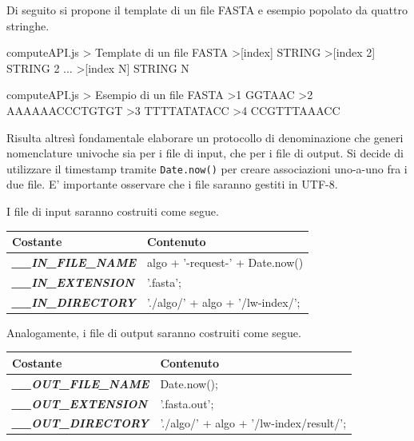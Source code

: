 Di seguito si propone il template di un file FASTA e esempio popolato da quattro stringhe.

\begin{sexylisting}{computeAPI.js > Template di un file FASTA}
>[index]
STRING
>[index 2]
STRING 2
...
>[index N]
STRING N
\end{sexylisting}

\begin{sexylisting}{computeAPI.js > Esempio di un file FASTA}
>1
GGTAAC
>2
AAAAAACCCTGTGT
>3
TTTTATATACC
>4
CCGTTTAAACC
\end{sexylisting}

Risulta altresì fondamentale elaborare un protocollo di denominazione che generi nomenclature univoche sia per i file di input, che per i file di output. Si decide di utilizzare il timestamp tramite \verb|Date.now()| per creare associazioni uno-a-uno fra i due file. E' importante osservare che i file saranno gestiti in UTF-8.

\vspace{5mm}

I file di input saranno costruiti come segue.

\begin{table}[H]
\begin{tabular}{@{}ll@{}}
\toprule
\textbf{Costante}                    & \textbf{Contenuto}               \\ \midrule
\textit{\textbf{\_\_IN\_FILE\_NAME}} & algo + '-request-' + Date.now()  \\
\textit{\textbf{\_\_IN\_EXTENSION}}  & '.fasta';                        \\
\textit{\textbf{\_\_IN\_DIRECTORY}}  & './algo/' + algo + '/lw-index/'; \\ \bottomrule
\end{tabular}
\end{table}

Analogamente, i file di output saranno costruiti come segue.

\begin{table}[H]
\begin{tabular}{ll}
\hline
\textbf{Costante}                     & \textbf{Contenuto}                      \\ \hline
\textit{\textbf{\_\_OUT\_FILE\_NAME}} & Date.now();                             \\
\textit{\textbf{\_\_OUT\_EXTENSION}}  & '.fasta.out';                           \\
\textit{\textbf{\_\_OUT\_DIRECTORY}}  & './algo/' + algo + '/lw-index/result/'; \\ \hline
\end{tabular}
\end{table}

